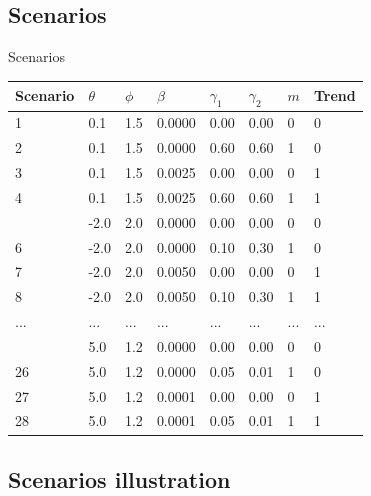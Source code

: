 \documentclass[aspectratio=169]{beamer}
\begin{document}
\hypertarget{scenarios}{%
\subsection{Scenarios}\label{scenarios}}

\begin{frame}{Scenarios}
\tiny

\begin{table}[H]
\centering\begingroup\fontsize{10}{12}\selectfont

\begin{tabular}[t]{llllllll}
\toprule
Scenario & $\theta$ & $\phi$ & $\beta$ & $\gamma_1$ & $\gamma_2$ & $m$ & Trend\\
\midrule
1 & 0.1 & 1.5 & 0.0000 & 0.00 & 0.00 & 0 & 0\\
2 & 0.1 & 1.5 & 0.0000 & 0.60 & 0.60 & 1 & 0\\
3 & 0.1 & 1.5 & 0.0025 & 0.00 & 0.00 & 0 & 1\\
4 & 0.1 & 1.5 & 0.0025 & 0.60 & 0.60 & 1 & 1\\
\addlinespace
5 & -2.0 & 2.0 & 0.0000 & 0.00 & 0.00 & 0 & 0\\
6 & -2.0 & 2.0 & 0.0000 & 0.10 & 0.30 & 1 & 0\\
7 & -2.0 & 2.0 & 0.0050 & 0.00 & 0.00 & 0 & 1\\
8 & -2.0 & 2.0 & 0.0050 & 0.10 & 0.30 & 1 & 1\\
\addlinespace
... & ... & ... & ... & ... & ... & ... & ...\\
\addlinespace
25 & 5.0 & 1.2 & 0.0000 & 0.00 & 0.00 & 0 & 0\\
26 & 5.0 & 1.2 & 0.0000 & 0.05 & 0.01 & 1 & 0\\
27 & 5.0 & 1.2 & 0.0001 & 0.00 & 0.00 & 0 & 1\\
28 & 5.0 & 1.2 & 0.0001 & 0.05 & 0.01 & 1 & 1\\
\bottomrule
\end{tabular}
\endgroup{}
\end{table}

\normalsize
\end{frame}

\hypertarget{scenarios-illustration}{%
\subsection{Scenarios illustration}\label{scenarios-illustration}}
\end{document}
